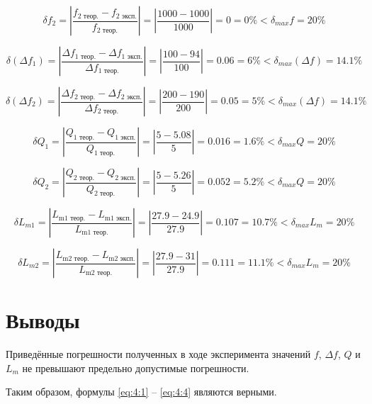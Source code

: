 \begin{displaymath}
	\delta f_2 = \left|\frac{f_\text{2 теор.} - f_\text{2 эксп.}}{f_\text{2 теор.}} \right| = \left|\frac{1000 - 1000}{1000}\right| = 0 = 0\% < \delta_{max} f = 20\%
\end{displaymath}

\begin{displaymath}
	\delta (\Delta f_1) = \left|\frac{\Delta f_\text{1 теор.} - \Delta f_\text{1 эксп.}}{\Delta f_\text{1 теор.}} \right| = \left|\frac{100 - 94}{100}\right| = 0.06 = 6\% < \delta_{max} (\Delta f) = 14.1\%
\end{displaymath}

\begin{displaymath}
	\delta (\Delta f_2) = \left|\frac{\Delta f_\text{2 теор.} - \Delta f_\text{2 эксп.}}{\Delta f_\text{2 теор.}} \right| = \left|\frac{200 - 190}{200}\right| = 0.05 = 5\% < \delta_{max} (\Delta f) = 14.1\%
\end{displaymath}

\begin{displaymath}
	\delta Q_1 = \left|\frac{Q_\text{1 теор.} - Q_\text{1 эксп.}}{Q_\text{1 теор.}} \right| = \left|\frac{5 - 5.08}{5}\right| = 0.016 = 1.6\% < \delta_{max} Q = 20\%
\end{displaymath}

\begin{displaymath}
	\delta Q_2 = \left|\frac{Q_\text{2 теор.} - Q_\text{2 эксп.}}{Q_\text{2 теор.}} \right| = \left|\frac{5 - 5.26}{5}\right| = 0.052 = 5.2\% < \delta_{max} Q = 20\%
\end{displaymath}

\begin{displaymath}
	\delta L_{m1} = \left|\frac{L_\text{m1 теор.} - L_\text{m1 эксп.}}{L_\text{m1 теор.}} \right| = \left|\frac{27.9 - 24.9}{27.9}\right| = 0.107 = 10.7\% < \delta_{max} L_m = 20\%
\end{displaymath}

\begin{displaymath}
	\delta L_{m2} = \left|\frac{L_\text{m2 теор.} - L_\text{m2 эксп.}}{L_\text{m2 теор.}} \right| = \left|\frac{27.9 - 31}{27.9}\right| = 0.111 = 11.1\% < \delta_{max} L_m = 20\%
\end{displaymath}

\section{Выводы}

Приведённые погрешности полученных в ходе эксперимента значений $f$, $\Delta f$, $Q$ и $L_m$ не превышают предельно допустимые погрешности.

Таким образом, формулы \ref{eq:4:1} -- \ref{eq:4:4} являются верными.

